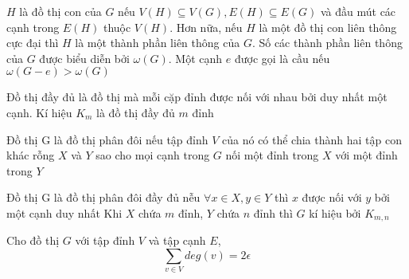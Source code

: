 \begin{definition}
    $H$ là đồ thị con của $G$ nếu $V(H) \subseteq V(G), E(H) \subseteq E(G)$ và đầu mút các cạnh trong $E(H)$ thuộc $V(H)$. Hơn nữa, nếu $H$ là một đồ thị con liên thông cực đại thì $H$ là một thành phần liên thông của $G$.
    Số các thành phần liên thông của $G$ được biểu diễn bởi $\omega(G)$. Một cạnh $e$ được gọi là cầu nếu $\omega(G-e) > \omega(G)$
\end{definition}

\begin{definition}
    Đồ thị đầy đủ là đồ thị mà mỗi cặp đỉnh được nối với nhau bởi duy nhất một cạnh. Kí hiệu $K_m$ là đồ thị đầy đủ $m$ đỉnh

    Đồ thị G là đồ thị phân đôi nếu tập đỉnh $V$ của nó có thể chia thành hai tập con khác rỗng $X$ và $Y$ sao cho mọi cạnh trong $G$ nối một đỉnh trong $X$ với một đỉnh trong $Y$

    Đồ thị G là đồ thị phân đôi đầy đủ nễu $\forall x \in X, y \in Y$ thì $x$ được nối với $y$ bởi một cạnh duy nhất
    Khi $X$ chứa $m$ đỉnh, $Y$ chứa $n$ đỉnh thì $G$ kí hiệu bởi $K_{m,n}$
    \begin{center}
        \hspace{2cm}
    \end{center}
\end{definition}
\begin{theorem}
    Cho đồ thị $G$ với tập đỉnh $V$ và tập cạnh $E$, $$\sum_{v\in V}deg(v) = 2\epsilon$$
\end{theorem}
